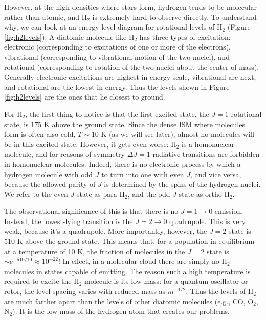 However, at the high densities where stars form, hydrogen tends to be molecular rather than atomic, and H$_2$ is extremely hard to observe directly. To understand why, we can look at an energy level diagram for rotational levels of H$_2$ (Figure \ref{fig:h2levels}). A diatomic molecule like H$_2$ has three types of excitation: electronic (corresponding to excitations of one or more of the electrons), vibrational (corresponding to vibrational motion of the two nuclei), and rotational (corresponding to rotation of the two nuclei about the center of mass). Generally electronic excitations are highest in energy scale, vibrational are next, and rotational are the lowest in energy. Thus the levels shown in Figure \ref{fig:h2levels} are the ones that lie closest to ground.

For H$_2$, the first thing to notice is that the first excited state, the $J=1$ rotational state, is $175$ K above the ground state. Since the dense ISM where molecules form is often also cold, $T\sim 10$ K (as we will see later), almost no molecules will be in this excited state. However, it gets even worse: H$_2$ is a homonuclear molecule, and for reasons of symmetry $\Delta J = 1$ radiative transitions are forbidden in homonuclear molecules. Indeed, there is no electronic process by which a hydrogen molecule with odd $J$ to turn into one with even $J$, and vice versa, because the allowed parity of $J$ is determined by the spins of the hydrogen nuclei. We refer to the even $J$ state as para-H$_2$, and the odd $J$ state as ortho-H$_2$.

The observational significance of this is that there is no $J=1\rightarrow 0$ emission. Instead, the lowest-lying transition is the $J=2\rightarrow 0$ quadrupole. This is very weak, because it's a quadrupole. More importantly, however, the $J=2$ state is 510 K above the ground state. This means that, for a population in equilibrium at a temperature of 10 K, the fraction of molecules in the $J=2$ state is $\sim e^{-510/10} \approx 10^{-22}$!  In effect, in a molecular cloud there are simply no H$_2$ molecules in states capable of emitting. The reason such a high temperature is required to excite the H$_2$ molecule is its low mass: for a quantum oscillator or rotor, the level spacing varies with reduced mass as $m^{-1/2}$. Thus the levels of H$_2$ are much farther apart than the levels of other diatomic molecules (e.g., CO, O$_2$, N$_2$). It is the low mass of the hydrogen atom that creates our problems.
  

